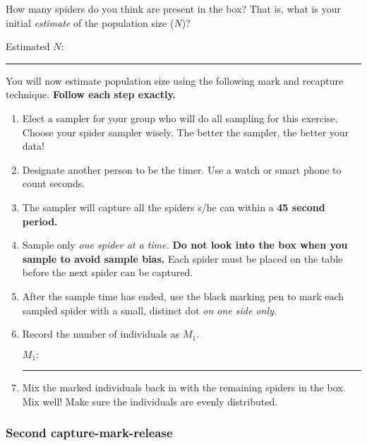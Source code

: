 \documentclass[12pt, hidelinks]{exam}
\begin{document}
\begin{questions}

\question
How many spiders do you think are present in the box? That is, what is your initial \emph{estimate} of the population size ($N$)?

\bigskip

Estimated $N\colon$ \rule{0.75in}{0.4pt}

You will now estimate population size using the following mark and recapture technique. \textbf{Follow each step exactly.}

\begin{enumerate}
	\item Elect a sampler for your group who will do all sampling for 
	this exercise. Choose your spider sampler wisely. The better
	the sampler, the better your data!
	
	\item Designate another person to be the timer. Use a watch or smart phone to count seconds.
	
	\item The sampler will capture all the spiders s/he can within a
	\textbf{45 second period.} 
	
	\item Sample only \emph{one spider at a time.}  \textbf{Do not look into the box when you sample to avoid sample bias.} Each spider must be
	placed on the table before the next spider can be captured. %
	
	\item After the sample time has ended, use the black marking pen to mark each sampled spider with a small, distinct dot \emph{on one side only.}
	
	\item Record the number of individuals as $M_1$.
	
	\bigskip
	
	$M_1\colon$ \rule{0.75in}{0.4pt}
	
	\item Mix the marked individuals back in with the remaining 
spiders in the box. Mix well! Make sure the individuals are evenly distributed.

\end{enumerate}

\subsubsection*{Second capture-mark-release}\label{sec:second_mark}


\end{questions}
\end{document}
